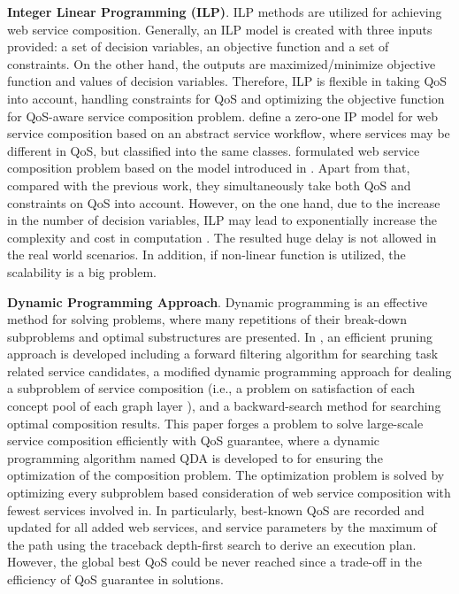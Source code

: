 \textbf{Integer Linear Programming (ILP)}. ILP methods are utilized for achieving web service composition. Generally, an ILP model is created with three inputs provided: a set of decision variables, an objective function and a set of constraints. On the other hand, the outputs are maximized/minimize objective function and values of decision variables. Therefore, ILP is flexible in taking QoS into account, handling constraints for QoS and optimizing the objective function for QoS-aware service composition problem. \cite{gao2005web} define a zero-one IP model for web service composition based on an abstract service workflow, where services may be different in QoS, but classified into the same classes.  \cite{yoo2008web} formulated web service composition problem based on the model introduced in \cite{gao2005web}. Apart from that, compared with the previous work, they simultaneously take both QoS and constraints on QoS into account. However, on the one hand, due to the increase in the number of decision variables, ILP may lead to exponentially increase the complexity and cost in computation \cite{li2016full}. The resulted huge delay is not allowed in the real world scenarios. In addition, if non-linear function is utilized, the scalability is a big problem.
 
\textbf{Dynamic Programming Approach}. Dynamic programming is an effective method for solving problems, where many repetitions of their break-down subproblems and optimal substructures are presented. In  \cite{huang2009effective}, an efficient pruning approach is developed including a forward filtering algorithm for searching task related service candidates, a modified dynamic programming approach for dealing a subproblem of service composition (i.e., a  problem on satisfaction of each concept pool of each graph layer ), and a backward-search method for searching optimal composition results. This paper \cite{xu2012towards} forges a problem to solve large-scale service composition efficiently with QoS guarantee, where a dynamic programming algorithm named QDA is developed to for ensuring the optimization of the composition problem. The optimization problem is solved by optimizing every subproblem based consideration of web service composition with fewest services involved in.  In particularly, best-known QoS are recorded and updated for all added web services, and service parameters by the maximum of the path using the traceback depth-first search to derive an execution plan. However, the global best QoS could be never reached since a trade-off in the efficiency of QoS guarantee in solutions.

